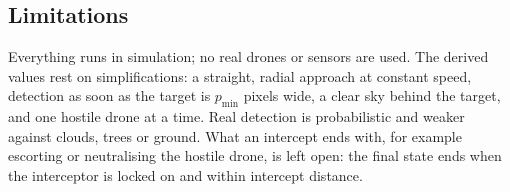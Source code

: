 \documentclass{article}
\begin{document}
\subsection{Limitations}

Everything runs in simulation; no real drones or sensors are used. The
derived values rest on simplifications: a straight, radial approach at
constant speed, detection as soon as the target is $p_{\min}$ pixels wide, a
clear sky behind the target, and one hostile drone at a time. Real detection
is probabilistic and weaker against clouds, trees or ground. What an intercept
ends with, for example escorting or neutralising the hostile drone, is left
open: the final state ends when the interceptor is locked on and within
intercept distance.





\printbibliography
\end{document}
